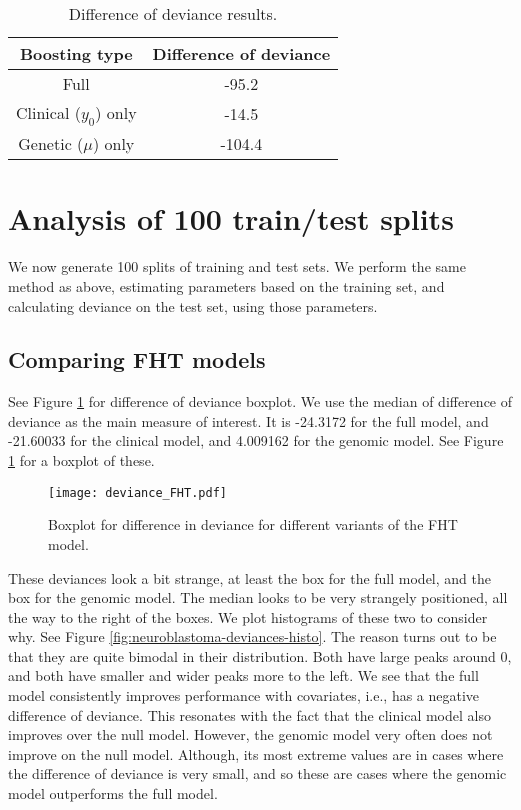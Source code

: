 \begin{table}
\caption{Difference of deviance results.}
\label{tab:deviances}
\centering
\begin{tabular}{cc}
\toprule
Boosting type & Difference of deviance \\
\hline
Full & -95.2 \\
Clinical ($y_0$) only  & -14.5 \\
Genetic ($\mu$) only & -104.4 \\
\bottomrule
\end{tabular}
\end{table}



\section{Analysis of 100 train/test splits}
We now generate 100 splits of training and test sets.
We perform the same method as above, estimating parameters based on the training set, and calculating deviance on the test set, using those parameters.

\subsection{Comparing FHT models}
See Figure \ref{fig:neuroblastoma-deviances} for difference of deviance boxplot.
We use the median of difference of deviance as the main measure of interest.
It is -24.3172 for the full model, and -21.60033 for the clinical model, and 4.009162 for the genomic model.
See Figure \ref{fig:neuroblastoma-deviances} for a boxplot of these.

\begin{figure}
\caption{Boxplot for difference in deviance for different variants of the FHT model.}
\label{fig:neuroblastoma-deviances}
\centering
\texttt{[image: deviance\_FHT.pdf]}
\end{figure}

These deviances look a bit strange, at least the box for the full model, and the box for the genomic model.
The median looks to be very strangely positioned, all the way to the right of the boxes.
We plot histograms of these two to consider why.
See Figure \ref {fig:neuroblastoma-deviances-histo}.
The reason turns out to be that they are quite bimodal in their distribution.
Both have large peaks around 0, and both have smaller and wider peaks more to the left.
We see that the full model consistently improves performance with covariates, i.e., has a negative difference of deviance.
This resonates with the fact that the clinical model also improves over the null model.
However, the genomic model very often does not improve on the null model.
Although, its most extreme values are in cases where the difference of deviance is very small, and so these are cases where the genomic model outperforms the full model.

